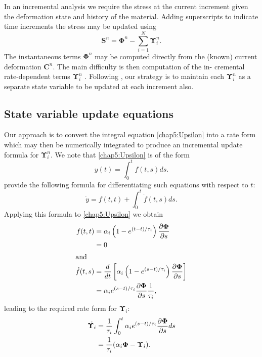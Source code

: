 \bigskip

\noindent In an incremental analysis we require the stress at the current increment given the deformation state and history of the material. Adding superscripts to indicate time increments the stress may be updated using
\begin{equation}
\label{chap5:updateStress}
\mathbf{S}^n = \boldsymbol \Phi^n - \sum_{i=1}^N \boldsymbol \Upsilon_i^n. 
\end{equation}
The instantaneous terms $ \boldsymbol \Phi^n $ may be computed directly from the (known) current deformation $ \mathbf{C}^n $. The main difficulty is then computation of the in- cremental rate-dependent terms $ \boldsymbol \Upsilon_i^n $ . Following \cite{Poon98}, our strategy is to maintain each $ \boldsymbol \Upsilon_i^n $ as a separate state variable to be updated at each increment also.

	\subsection{State variable update equations}	
Our approach is to convert the integral equation \eqref{chap5:Upsilon} into a rate form which may then be numerically integrated to produce an incremental update formula for $ \boldsymbol \Upsilon_i^n $. We note that \eqref{chap5:Upsilon} is of the form
\begin{equation}
y(t) = \int_0^t f(t,s) ds.
\end{equation}
\cite{Poon98} provide the following formula for differentiating such equations with respect to $ t $:
\begin{equation}
\dot y = f(t, t) + \int_0^t \dot f(t,s) ds.
\end{equation}
Applying this formula to \eqref{chap5:Upsilon} we obtain
\begin{align}
f(t, t) &= \alpha_i \left( 1-e^{(t-t)/\tau_i} \right) \dfrac{\partial \boldsymbol \Phi}{\partial s} \notag \\
&= 0 \\
\intertext{and}
\dot f(t, s) &= \dfrac{d}{dt} \left[ \alpha_i \left( 1-e^{(s-t)/\tau_i} \right) \dfrac{\partial \boldsymbol \Phi}{\partial s} \right] \notag \\
&= \alpha_i e^{(s-t)/\tau_i} \dfrac{\partial \boldsymbol \Phi}{\partial s} \dfrac{1}{\tau_i},
\end{align}
leading to the required rate form for $ \boldsymbol \Upsilon_i $:
\begin{align}
\dot{\boldsymbol \Upsilon_i}  &= \dfrac{1}{\tau_i} \int_0^t \alpha_i e^{(s-t)/\tau_i} \dfrac{\partial \boldsymbol \Phi}{\partial s} ds \notag \\
&= \dfrac{1}{\tau_i} (\alpha_i \boldsymbol \Phi - \boldsymbol \Upsilon_i). \label{chap5:UpsilonRate}
\end{align}


